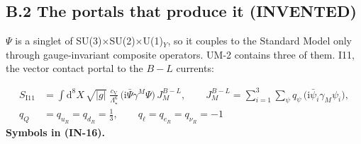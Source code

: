 \documentclass[
  10pt,
]{article}
\begin{document}
\hypertarget{b.2-the-portals-that-produce-it-invented}{%
\subsection*{B.2 The portals that produce it
(INVENTED)}\label{b.2-the-portals-that-produce-it-invented}}

\(\Psi\) is a singlet of SU(3)\(\times\)SU(2)\(\times\)U(1)\(_Y\), so it
couples to the Standard Model only through gauge-invariant composite
operators. UM-2 contains three of them. I11, the vector contact portal
to the \(B - L\) currents:

\[
\begin{aligned}
S_{\mathrm{I11}} &= \int\mathrm{d}^8X\,\sqrt{\lvert g\rvert}\;\frac{c_{\mathrm{V}}}{\Lambda_\star^6}\,
 \big(\mathrm{i}\bar\Psi\gamma^M\Psi\big)\,J^{B-L}_M,\qquad
 J^{B-L}_M = \sum_{i=1}^{3}\sum_{\psi} q_\psi\,\big(\mathrm{i}\bar\psi_i\gamma_M\psi_i\big),\\
q_Q &= q_{u_R} = q_{d_R} = \frac13,\qquad q_\ell = q_{e_R} = q_{\nu_R} = -1
\end{aligned} \tag{IN-16}
\] \textbf{Symbols in (IN-16).}
\end{document}
